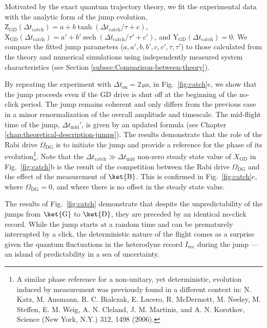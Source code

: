 Motivated by the exact quantum trajectory theory, we fit the experimental
data with the analytic form of the jump evolution, $\mathrm{Z}_{\text{GD}}(\Delta t_{\operatorname{catch}})=a+b\tanh(\Delta t_{\operatorname{catch}}/\tau+c)$,
$\mathrm{X}_{\text{GD}}(\Delta t_{\operatorname{catch}})=a'+b'\operatorname{sech}(\Delta t_{\operatorname{catch}}/\tau'+c')$,
and $\mathrm{Y}_{\text{GD}}(\Delta t_{\operatorname{catch}})=0$.
We compare the fitted jump parameters ($a,a',b,b',c,c',\tau,\tau'$)
to those calculated from the theory and numerical simulations using
independently measured system characteristics (see Section \ref{subsec:Comparison-between-theory}).

By repeating the experiment with $\Delta t_{\text{on}}=2\,\mathrm{\mu s}$,
in Fig.~\ref{fig:catch}c, we show that the jump proceeds even if
the GD drive is shut off at the beginning of the no-click period.
The jump remains coherent and only differs from the previous case
in a minor renormalization of the overall amplitude and timescale.
The mid-flight time of the jump, $\Delta t_{\mathrm{mid}}'$, is given
by an updated formula (see Chapter \ref{chap:theoretical-description-jumps}).
The results demonstrate that the role of the Rabi drive $\Omega_{\mathrm{DG}}$
is to initiate the jump and provide a reference for the phase of its
evolution\footnote{A similar phase reference for a non-unitary, yet deterministic, evolution
induced by measurement was previously found in a different context
in: N. Katz, M. Ansmann, R. C. Bialczak, E. Lucero, R. McDermott,
M. Neeley, M. Steffen, E. M. Weig, A. N. Cleland, J. M. Martinis,
and A. N. Korotkov, Science (New York, N.Y.) 312, 1498 (2006).}. Note that the $\Delta t_{\mathrm{catch}}\gg\Delta t_{\mathrm{mid}}$
non-zero steady state value of $X_{\mathrm{GD}}$ in Fig.~\ref{fig:catch}b
is the result of the competition between the Rabi drive $\Omega_{\mathrm{DG}}$
and the effect of the measurement of $\ket{\mathrm{B}}$. This is
confirmed in Fig.~\ref{fig:catch}c, where $\Omega_{\mathrm{DG}}=0$,
and where there is no offset in the steady state value.

The results of Fig.~\ref{fig:catch} demonstrate that despite the
unpredictability of the jumps from $\ket{\mathrm{G}}$ to $\ket{\mathrm{D}}$,
they are preceded by an identical no-click record. While the jump
starts at a random time and can be prematurely interrupted by a click,
the deterministic nature of the flight comes as a surprise given the
quantum fluctuations in the heterodyne record $I_{\mathrm{rec}}$
during the jump --- an island of predictability in a sea of uncertainty. 

